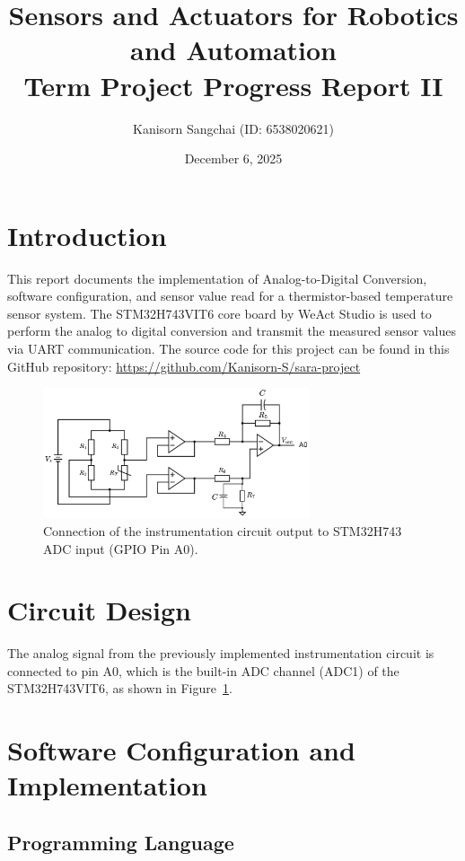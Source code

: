 \documentclass[12pt,a4paper]{article}
\title{Sensors and Actuators for Robotics and
Automation\\Term Project Progress Report II}
\author{Kanisorn Sangchai (ID: 6538020621)}
\date{December 6, 2025}
\begin{document}
\maketitle

\section{Introduction}
This report documents the implementation of Analog-to-Digital Conversion, software configuration, and sensor value read for a thermistor-based temperature sensor system. The STM32H743VIT6 core board by WeAct Studio is used to perform the analog to digital conversion and transmit the measured sensor values via UART communication. The source code for this project can be found in this GitHub repository: \url{https://github.com/Kanisorn-S/sara-project}

\begin{figure}[h]
    \centering
    \includegraphics[width=0.7\textwidth]{images/circuit_diagram.png}
    \caption{Connection of the instrumentation circuit output to STM32H743 ADC input (GPIO Pin A0).}
    \label{fig:circuit}
\end{figure}

\section{Circuit Design}
The analog signal from the previously implemented instrumentation circuit is connected to pin A0, which is the built-in ADC channel (ADC1) of the STM32H743VIT6, as shown in Figure~\ref{fig:circuit}.  

\section{Software Configuration and Implementation}

\subsection{Programming Language}
\end{document}
